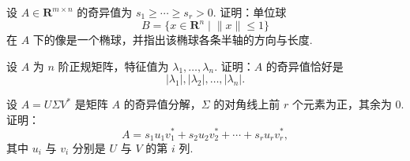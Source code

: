 \begin{exercise}
    \begin{exgroup}
        \item 设 $A \in \mathbf{R}^{m \times n}$ 的奇异值为 $s_1 \geqslant \cdots \geqslant s_r > 0$. 证明：单位球
        \[
            B = \{x \in \mathbf{R}^n \mid \lVert x \rVert \leqslant 1\}
        \]
        在 $A$ 下的像是一个椭球，并指出该椭球各条半轴的方向与长度.

        \item 设 $A$ 为 $n$ 阶正规矩阵，特征值为 $\lambda_1, \ldots, \lambda_n$. 证明：$A$ 的奇异值恰好是
        \[
            |\lambda_1|, |\lambda_2|, \ldots, |\lambda_n|.
        \]

        \item 设 $A = U\Sigma V^*$ 是矩阵 $A$ 的奇异值分解，$\Sigma$ 的对角线上前 $r$ 个元素为正，其余为 $0$. 证明：
        \[
            A = s_1u_1v_1^* + s_2u_2v_2^* + \cdots + s_ru_rv_r^*,
        \]
        其中 $u_i$ 与 $v_i$ 分别是 $U$ 与 $V$ 的第 $i$ 列.
    \end{exgroup}
\end{exercise}
